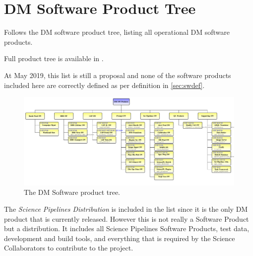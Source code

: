 \newpage
\section{DM Software Product Tree}\label{sec:swptree}

Follows the \gls{DM} software product tree, listing all operational \gls{DM} software products.

Full product tree is available in .

At May 2019, this list is still a proposal and none of the software products included here are correctly defined as per definition in \ref{sec:swdef}.



\begin{figure}
\begin{center}
 \includegraphics[width=1.1\textwidth]{ProductTreeLand}

 \caption{The \gls{DM} Software product tree.}
 \label{fig:doctree}

\end{center}
\end{figure}

The \textit{Science Pipelines Distribution} is included in the list since it is the only \gls{DM} product that is currently released.
However this is not really a Software Product but a distribution.
It includes all Science Pipelines Software Products, test data, development and build tools, and everything that is required by the Science Collaborators to contribute to the project.
